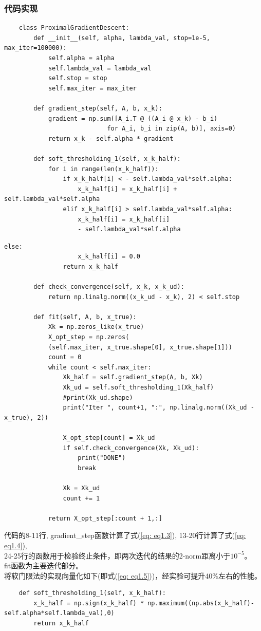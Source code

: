 \documentclass{article}
\begin{document}
\subsubsection{代码实现}
\begin{lstlisting}
    class ProximalGradientDescent:
        def __init__(self, alpha, lambda_val, stop=1e-5, max_iter=100000):
            self.alpha = alpha
            self.lambda_val = lambda_val
            self.stop = stop
            self.max_iter = max_iter

        def gradient_step(self, A, b, x_k):
            gradient = np.sum([A_i.T @ ((A_i @ x_k) - b_i)
                            for A_i, b_i in zip(A, b)], axis=0)
            return x_k - self.alpha * gradient

        def soft_thresholding_1(self, x_k_half):
            for i in range(len(x_k_half)):
                if x_k_half[i] < - self.lambda_val*self.alpha:
                    x_k_half[i] = x_k_half[i] + self.lambda_val*self.alpha
                elif x_k_half[i] > self.lambda_val*self.alpha:
                    x_k_half[i] = x_k_half[i] 
                    - self.lambda_val*self.alpha
\end{lstlisting}
\newpage
\begin{lstlisting}[firstnumber=20]
                else:
                    x_k_half[i] = 0.0
                return x_k_half

        def check_convergence(self, x_k, x_k_ud):
            return np.linalg.norm((x_k_ud - x_k), 2) < self.stop

        def fit(self, A, b, x_true):
            Xk = np.zeros_like(x_true)
            X_opt_step = np.zeros(
            (self.max_iter, x_true.shape[0], x_true.shape[1]))
            count = 0
            while count < self.max_iter:
                Xk_half = self.gradient_step(A, b, Xk)
                Xk_ud = self.soft_thresholding_1(Xk_half)
                #print(Xk_ud.shape)
                print("Iter ", count+1, ":", np.linalg.norm((Xk_ud - x_true), 2))

                X_opt_step[count] = Xk_ud
                if self.check_convergence(Xk, Xk_ud):
                    print("DONE")
                    break

                Xk = Xk_ud
                count += 1

            return X_opt_step[:count + 1,:]
\end{lstlisting}
\noindent
代码的8-11行, gradient\_step函数计算了式(\ref{eq: eq1.3}), 13-20行计算了式(\ref{eq: eq1.4}),\\
24-25行的函数用于检验终止条件，即两次迭代的结果的2-norm距离小于$10^{-5}$。\\
fit函数为主要迭代部分。\\
将软门限法的实现向量化如下(即式(\ref{eq: eq1.5}))，经实验可提升40\%左右的性能。
\begin{lstlisting}
    def soft_thresholding_1(self, x_k_half):
        x_k_half = np.sign(x_k_half) * np.maximum((np.abs(x_k_half)-self.alpha*self.lambda_val),0)
        return x_k_half
\end{lstlisting}
\end{document}
